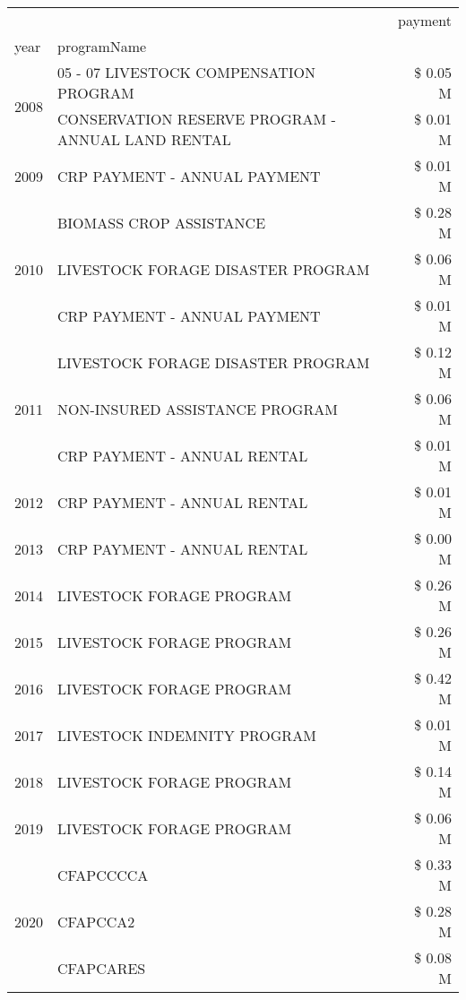 \begin{tabular}{llr}
\toprule
 &  & payment \\
year & programName &  \\
\midrule
\multirow[t]{2}{*}{2008} & 05 - 07 LIVESTOCK COMPENSATION PROGRAM & \$ 0.05 M \\
 & CONSERVATION RESERVE PROGRAM - ANNUAL LAND RENTAL & \$ 0.01 M \\
\cline{1-3}
2009 & CRP PAYMENT - ANNUAL PAYMENT & \$ 0.01 M \\
\cline{1-3}
\multirow[t]{3}{*}{2010} & BIOMASS CROP ASSISTANCE & \$ 0.28 M \\
 & LIVESTOCK FORAGE DISASTER  PROGRAM & \$ 0.06 M \\
 & CRP PAYMENT - ANNUAL PAYMENT & \$ 0.01 M \\
\cline{1-3}
\multirow[t]{3}{*}{2011} & LIVESTOCK FORAGE DISASTER PROGRAM & \$ 0.12 M \\
 & NON-INSURED ASSISTANCE PROGRAM & \$ 0.06 M \\
 & CRP PAYMENT - ANNUAL RENTAL & \$ 0.01 M \\
\cline{1-3}
2012 & CRP PAYMENT - ANNUAL RENTAL & \$ 0.01 M \\
\cline{1-3}
2013 & CRP PAYMENT - ANNUAL RENTAL & \$ 0.00 M \\
\cline{1-3}
2014 & LIVESTOCK FORAGE PROGRAM & \$ 0.26 M \\
\cline{1-3}
2015 & LIVESTOCK FORAGE PROGRAM & \$ 0.26 M \\
\cline{1-3}
2016 & LIVESTOCK FORAGE PROGRAM & \$ 0.42 M \\
\cline{1-3}
2017 & LIVESTOCK INDEMNITY PROGRAM & \$ 0.01 M \\
\cline{1-3}
2018 & LIVESTOCK FORAGE PROGRAM & \$ 0.14 M \\
\cline{1-3}
2019 & LIVESTOCK FORAGE PROGRAM & \$ 0.06 M \\
\cline{1-3}
\multirow[t]{3}{*}{2020} & CFAPCCCCA & \$ 0.33 M \\
 & CFAPCCA2 & \$ 0.28 M \\
 & CFAPCARES & \$ 0.08 M \\
\cline{1-3}
\bottomrule
\end{tabular}

